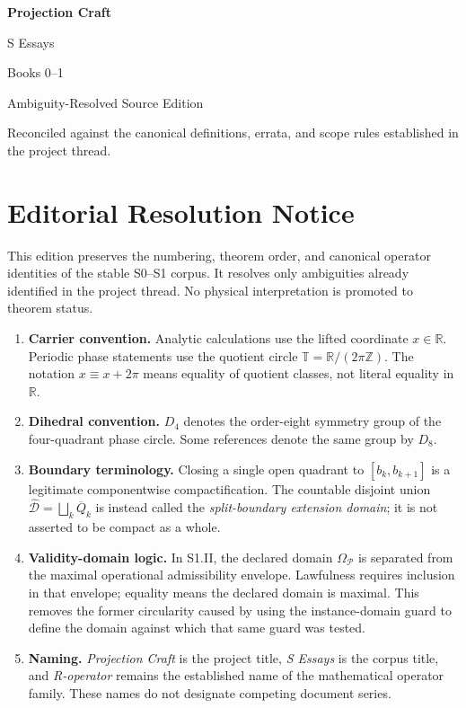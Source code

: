 \documentclass[11pt,oneside,openany]{book}
\begin{document}
\begin{titlepage}
  \centering
  \vspace*{0.14\textheight}
  {\Huge\bfseries\sffamily Projection Craft\par}
  \vspace{1.2em}
  {\LARGE\sffamily S Essays\par}
  \vspace{0.7em}
  {\Large Books 0--1\par}
  \vfill
  {\large Ambiguity-Resolved Source Edition\par}
  \vspace{0.6em}
  {\small Reconciled against the canonical definitions, errata, and scope rules established in the project thread.\par}
  \vspace*{0.08\textheight}
\end{titlepage}
\frontmatter
\chapter*{Editorial Resolution Notice}
This edition preserves the numbering, theorem order, and canonical operator identities of the stable S0--S1 corpus. It resolves only ambiguities already identified in the project thread. No physical interpretation is promoted to theorem status.

\begin{enumerate}
\item \textbf{Carrier convention.} Analytic calculations use the lifted coordinate \(x\in\mathbb R\). Periodic phase statements use the quotient circle \(\mathbb T=\mathbb R/(2\pi\mathbb Z)\). The notation \(x\equiv x+2\pi\) means equality of quotient classes, not literal equality in \(\mathbb R\).
\item \textbf{Dihedral convention.} \(D_4\) denotes the order-eight symmetry group of the four-quadrant phase circle. Some references denote the same group by \(D_8\).
\item \textbf{Boundary terminology.} Closing a single open quadrant to \([b_k,b_{k+1}]\) is a legitimate componentwise compactification. The countable disjoint union \(\widehat{\mathcal D}=\bigsqcup_k\overline Q_k\) is instead called the \emph{split-boundary extension domain}; it is not asserted to be compact as a whole.
\item \textbf{Validity-domain logic.} In S1.II, the declared domain \(\Omega_{\mathcal P}\) is separated from the maximal operational admissibility envelope. Lawfulness requires inclusion in that envelope; equality means the declared domain is maximal. This removes the former circularity caused by using the instance-domain guard to define the domain against which that same guard was tested.
\item \textbf{Naming.} \emph{Projection Craft} is the project title, \emph{S Essays} is the corpus title, and \emph{R-operator} remains the established name of the mathematical operator family. These names do not designate competing document series.
\end{enumerate}
\end{document}
